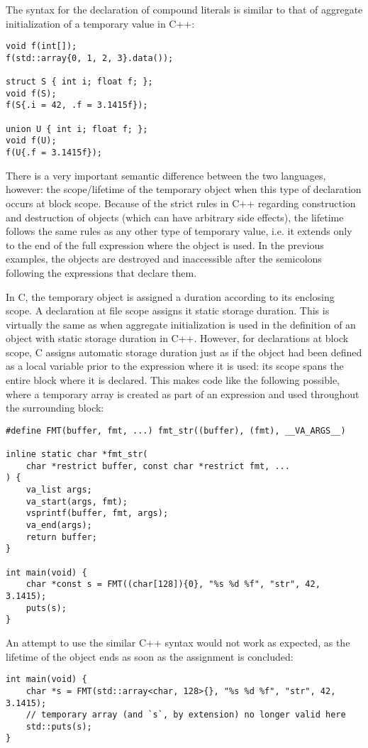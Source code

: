 The syntax for the declaration of compound literals is similar to that of
aggregate initialization of a temporary value in C++:

\begin{lstlisting}[style=c++]
void f(int[]);
f(std::array{0, 1, 2, 3}.data());

struct S { int i; float f; };
void f(S);
f(S{.i = 42, .f = 3.1415f});

union U { int i; float f; };
void f(U);
f(U{.f = 3.1415f});
\end{lstlisting}

There is a very important semantic difference between the two languages,
however: the scope/lifetime of the temporary object when this type of
declaration occurs at block scope.  Because of the strict rules in C++ regarding
construction and destruction of objects (which can have arbitrary side effects),
the lifetime follows the same rules as any other type of temporary value, i.e.
it extends only to the end of the full expression where the object is used.  In
the previous examples, the objects are destroyed and inaccessible after the
semicolons following the expressions that declare them.

In C, the temporary object is assigned a duration according to its enclosing
scope.  A declaration at file scope assigns it static storage duration.  This is
virtually the same as when aggregate initialization is used in the definition of
an object with static storage duration in C++.  However, for declarations at
block scope, C assigns automatic storage duration just as if the object had been
defined as a local variable prior to the expression where it is used: its scope
spans the entire block where it is declared.  This makes code like the following
possible, where a temporary array is created as part of an expression and used
throughout the surrounding block:

\begin{lstlisting}[style=c]
#define FMT(buffer, fmt, ...) fmt_str((buffer), (fmt), __VA_ARGS__)

inline static char *fmt_str(
    char *restrict buffer, const char *restrict fmt, ...
) {
    va_list args;
    va_start(args, fmt);
    vsprintf(buffer, fmt, args);
    va_end(args);
    return buffer;
}

int main(void) {
    char *const s = FMT((char[128]){0}, "%s %d %f", "str", 42, 3.1415);
    puts(s);
}
\end{lstlisting}

An attempt to use the similar C++ syntax would not work as expected, as the
lifetime of the object ends as soon as the assignment is concluded:

\begin{lstlisting}[style=c++]
int main(void) {
    char *s = FMT(std::array<char, 128>{}, "%s %d %f", "str", 42, 3.1415);
    // temporary array (and `s`, by extension) no longer valid here
    std::puts(s);
}
\end{lstlisting}
